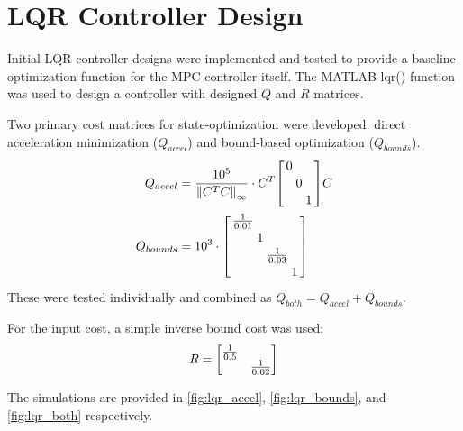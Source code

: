 \documentclass[onecolumn]{IEEEtran}
\begin{document}
\newpage \clearpage
\section{LQR Controller Design}
Initial LQR controller designs were implemented and tested to provide a baseline optimization function for the MPC controller itself.
The MATLAB lqr() function was used to design a controller with designed $Q$ and $R$ matrices.

Two primary cost matrices for state-optimization were developed: direct acceleration minimization ($Q_{accel}$) and bound-based optimization ($Q_{bounds}$).
\begin{align}
    Q_{accel} &= \frac{10^5}{\norm{C^T C}_\infty} \cdot C^T \smqty[\dmat{0,0,1}] C
    \\
    Q_{bounds} &= 10^3 \cdot \smqty[\dmat{\frac{1}{0.01},1,\frac{1}{0.03},1}]
\end{align}
These were tested individually and combined as $Q_{both} = Q_{accel} + Q_{bounds}$.

For the input cost, a simple inverse bound cost was used:
\begin{gather}
    R = \mqty[\dmat{\frac{1}{0.5}, \frac{1}{0.02}}]
\end{gather}

The simulations are provided in \autoref{fig:lqr_accel}, \autoref{fig:lqr_bounds}, and \autoref{fig:lqr_both} respectively.
\end{document}
